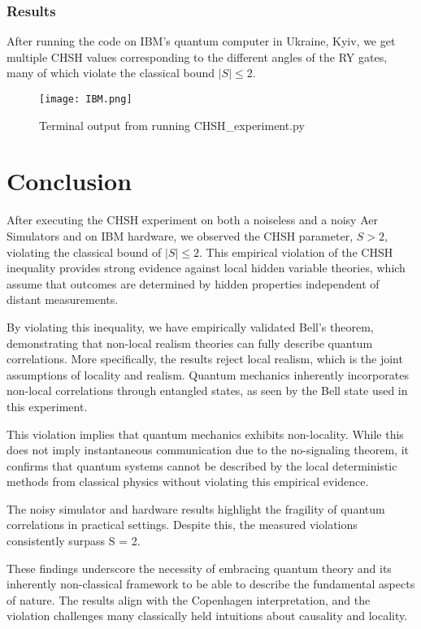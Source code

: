 \documentclass[12pt]{article}
\begin{document}
\subsubsection{Results}

After running the code on IBM's quantum computer in Ukraine, Kyiv, we get multiple CHSH values corresponding to the different angles of the RY gates, many of which violate the classical bound \( |S| \leq 2 \).


\begin{figure}[h]
    \centering
    \texttt{[image: IBM.png]}
    \caption{Terminal output from running CHSH\_experiment.py}
    \label{fig:results}
\end{figure}

\newpage
\section{Conclusion}
After executing the CHSH experiment on both a noiseless and a noisy Aer Simulators and on IBM hardware, we observed the CHSH parameter, \( S > 2 \), violating the classical bound of \( |S| \leq 2 \). This empirical violation of the CHSH inequality provides strong evidence against local hidden variable theories, which assume that outcomes are determined by hidden properties independent of distant measurements. 

By violating this inequality, we have empirically validated Bell's theorem, demonstrating that non-local realism theories can fully describe quantum correlations. More specifically, the results reject local realism, which is the joint assumptions of locality and realism. Quantum mechanics inherently incorporates non-local correlations through entangled states, as seen by the Bell state used in this experiment.

This violation implies that quantum mechanics exhibits non-locality. While this does not imply instantaneous communication due to the no-signaling theorem, it confirms that quantum systems cannot be described by the local deterministic methods from classical physics without violating this empirical evidence.

The noisy simulator and hardware results highlight the fragility of quantum correlations in practical settings. Despite this, the measured violations consistently surpass S = 2.

These findings underscore the necessity of embracing quantum theory and its inherently non-classical framework to be able to describe the fundamental aspects of nature. The results align with the Copenhagen interpretation, and the violation challenges many classically held intuitions about causality and locality. 
\end{document}
